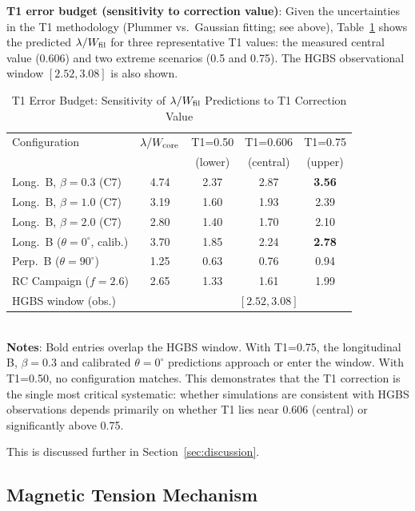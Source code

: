 \documentclass[twoside,twocolumn]{mnras}
\begin{document}
\textbf{T1 error budget (sensitivity to correction value)}: Given the uncertainties in the T1 methodology (Plummer vs.\ Gaussian fitting; see above), Table~\ref{tab:t1_budget} shows the predicted $\lambda/W_{\rm fil}$ for three representative T1 values: the measured central value (0.606) and two extreme scenarios (0.5 and 0.75). The HGBS observational window $[2.52, 3.08]$ is also shown.

\begin{table}
\caption{T1 Error Budget: Sensitivity of $\lambda/W_{\rm fil}$ Predictions to T1 Correction Value}
\label{tab:t1_budget}
\small
\begin{tabular}{lcccc}
\toprule
Configuration & $\lambda/W_{\rm core}$ & T1=0.50 & T1=0.606 & T1=0.75 \\
              &                       & (lower) & (central) & (upper) \\
\midrule
Long.\ B, $\beta=0.3$ (C7) & 4.74 & 2.37 & 2.87 & \textbf{3.56} \\
Long.\ B, $\beta=1.0$ (C7) & 3.19 & 1.60 & 1.93 & 2.39 \\
Long.\ B, $\beta=2.0$ (C7) & 2.80 & 1.40 & 1.70 & 2.10 \\
Long.\ B ($\theta=0^\circ$, calib.) & 3.70 & 1.85 & 2.24 & \textbf{2.78} \\
Perp.\ B ($\theta=90^\circ$) & 1.25 & 0.63 & 0.76 & 0.94 \\
RC Campaign ($f=2.6$) & 2.65 & 1.33 & 1.61 & 1.99 \\
\midrule
\multicolumn{2}{l}{HGBS window (obs.)} & \multicolumn{3}{c}{$[2.52, 3.08]$} \\
\bottomrule
\end{tabular}
\\[2pt]
\footnotesize
\textbf{Notes}: Bold entries overlap the HGBS window. With T1=0.75, the longitudinal B, $\beta=0.3$ and calibrated $\theta=0^\circ$ predictions approach or enter the window. With T1=0.50, no configuration matches. This demonstrates that the T1 correction is the single most critical systematic: whether simulations are consistent with HGBS observations depends primarily on whether T1 lies near 0.606 (central) or significantly above 0.75.
\end{table}

This is discussed further in Section~\ref{sec:discussion}.

\subsection{Magnetic Tension Mechanism}
\end{document}
